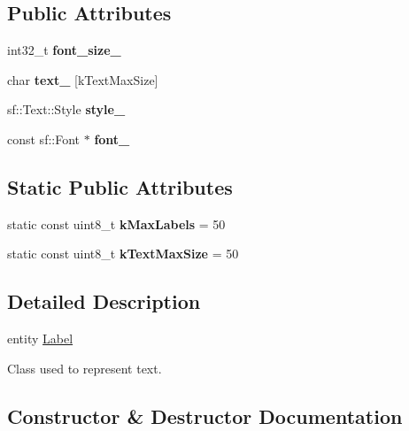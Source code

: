 \subsection*{Public Attributes}
\begin{DoxyCompactItemize}
\item 
\mbox{\label{class_label_a96bfd593e67f9031a244732fed63358f}} 
int32\+\_\+t {\bfseries font\+\_\+size\+\_\+}
\item 
\mbox{\label{class_label_a272e5426b0989b667b42cc4c87d697a7}} 
char {\bfseries text\+\_\+} \mbox{[}k\+Text\+Max\+Size\mbox{]}
\item 
\mbox{\label{class_label_a2f2da01fed83e50368d3d3674ed11d1b}} 
sf\+::\+Text\+::\+Style {\bfseries style\+\_\+}
\item 
\mbox{\label{class_label_a19110944dc9f96e238ca9e807d06421c}} 
const sf\+::\+Font $\ast$ {\bfseries font\+\_\+}
\end{DoxyCompactItemize}
\subsection*{Static Public Attributes}
\begin{DoxyCompactItemize}
\item 
\mbox{\label{class_label_a00ba8c3c345de6f169c739243aad2634}} 
static const uint8\+\_\+t {\bfseries k\+Max\+Labels} = 50
\item 
\mbox{\label{class_label_a73c9a955b95b4e3dfbba8b4a7771d64a}} 
static const uint8\+\_\+t {\bfseries k\+Text\+Max\+Size} = 50
\end{DoxyCompactItemize}


\subsection{Detailed Description}
entity \hyperlink{class_label}{Label}

Class used to represent text. 

\subsection{Constructor \& Destructor Documentation}
\mbox{\label{class_label_a39e1167a9b5827afd888780973d88894}} 
